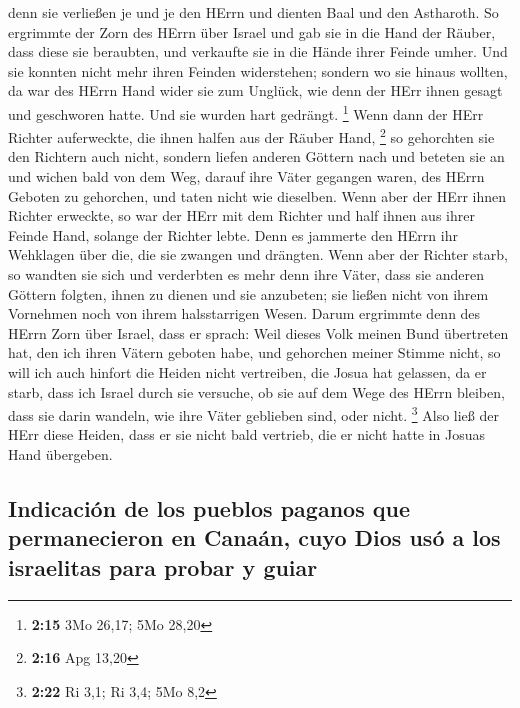  denn sie verließen je und je den HErrn und dienten Baal
und den Astharoth.  So ergrimmte der Zorn des HErrn über
Israel und gab sie in die Hand der Räuber, dass diese sie beraubten, und
verkaufte sie in die Hände ihrer Feinde umher. Und sie konnten nicht
mehr ihren Feinden widerstehen;  sondern wo sie hinaus
wollten, da war des HErrn Hand wider sie zum Unglück, wie denn der HErr
ihnen gesagt und geschworen hatte. Und sie wurden hart gedrängt.
\footnote{\textbf{2:15} 3Mo 26,17; 5Mo 28,20}  Wenn dann
der HErr Richter auferweckte, die ihnen halfen aus der Räuber Hand,
\footnote{\textbf{2:16} Apg 13,20}  so gehorchten sie den
Richtern auch nicht, sondern liefen anderen Göttern nach und beteten sie
an und wichen bald von dem Weg, darauf ihre Väter gegangen waren, des
HErrn Geboten zu gehorchen, und taten nicht wie dieselben.
 Wenn aber der HErr ihnen Richter erweckte, so war der
HErr mit dem Richter und half ihnen aus ihrer Feinde Hand, solange der
Richter lebte. Denn es jammerte den HErrn ihr Wehklagen über die, die
sie zwangen und drängten.  Wenn aber der Richter starb,
so wandten sie sich und verderbten es mehr denn ihre Väter, dass sie
anderen Göttern folgten, ihnen zu dienen und sie anzubeten; sie ließen
nicht von ihrem Vornehmen noch von ihrem halsstarrigen Wesen.
 Darum ergrimmte denn des HErrn Zorn über Israel, dass er
sprach: Weil dieses Volk meinen Bund übertreten hat, den ich ihren
Vätern geboten habe, und gehorchen meiner Stimme nicht, 
so will ich auch hinfort die Heiden nicht vertreiben, die Josua hat
gelassen, da er starb,  dass ich Israel durch sie
versuche, ob sie auf dem Wege des HErrn bleiben, dass sie darin wandeln,
wie ihre Väter geblieben sind, oder nicht. \footnote{\textbf{2:22} Ri
  3,1; Ri 3,4; 5Mo 8,2}  Also ließ der HErr diese Heiden,
dass er sie nicht bald vertrieb, die er nicht hatte in Josuas Hand
übergeben.

\hypertarget{indicaciuxf3n-de-los-pueblos-paganos-que-permanecieron-en-canauxe1n-cuyo-dios-usuxf3-a-los-israelitas-para-probar-y-guiar}{%
\subsection{Indicación de los pueblos paganos que permanecieron en
Canaán, cuyo Dios usó a los israelitas para probar y
guiar}\label{indicaciuxf3n-de-los-pueblos-paganos-que-permanecieron-en-canauxe1n-cuyo-dios-usuxf3-a-los-israelitas-para-probar-y-guiar}}

